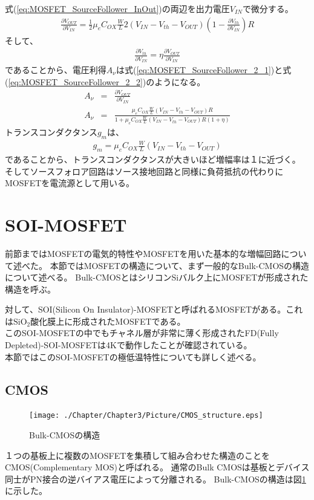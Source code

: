 			式(\ref{eq:MOSFET_SourceFollower_InOut})の両辺を出力電圧$V_{IN}$で微分する。
			\begin{eqnarray}
				\frac{\partial V_{OUT}}{\partial V_{IN}} = \frac{1}{2} \mu_e C_{OX} \frac{W}{L} 2 (V_{IN} - V_{th} - V_{OUT}) \left( 1 - \frac{\partial V_{th}}{\partial V_{IN}} \right) R
				\label{eq:MOSFET_SourceFollower_1}
			\end{eqnarray}
			そして、
			\begin{eqnarray}
				\frac{\partial V_{th}}{\partial V_{IN}} = \eta \frac{\partial V_{OUT}}{\partial V_{IN}}
			\end{eqnarray}
			であることから、電圧利得$A_{\nu}$は式(\ref{eq:MOSFET_SourceFollower_2_1})と式(\ref{eq:MOSFET_SourceFollower_2_2})のようになる。
			\begin{eqnarray}
				A_{\nu} & = & \frac{\partial V_{OUT}}{\partial V_{IN}} \\
				\label{eq:MOSFET_SourceFollower_2_1}
				A_{\nu} & = & \frac{\mu_e C_{OX} \frac{W}{L} (V_{IN} - V_{th} - V_{OUT}) R}{1 + \mu_e C_{OX} \frac{W}{L} (V_{IN} - V_{th} - V_{OUT}) R (1 + \eta)}
				\label{eq:MOSFET_SourceFollower_2_2}
			\end{eqnarray}
			トランスコンダクタンス$g_m$は、
			\begin{eqnarray}
				g_m = \mu_e C_{OX} \frac{W}{L} (V_{IN} - V_{th} - V_{OUT})
			\end{eqnarray}
			であることから、トランスコンダクタンスが大きいほど増幅率は１に近づく。
			そしてソースフォロア回路はソース接地回路と同様に負荷抵抗の代わりにMOSFETを電流源として用いる。
			\clearpage
\section{SOI-MOSFET}
	前節まではMOSFETの電気的特性やMOSFETを用いた基本的な増幅回路について述べた。
	本節ではMOSFETの構造について、まず一般的なBulk-CMOSの構造について述べる。
	Bulk-CMOSとはシリコンSiバルク上にMOSFETが形成された構造を呼ぶ。
	
	対して、SOI(Silicon On Insulator)-MOSFETと呼ばれるMOSFETがある。これは$\mathrm{SiO_2}$酸化膜上に形成されたMOSFETである。\\
	このSOI-MOSFETの中でもチャネル層が非常に薄く形成されたFD(Fully Depleted)-SOI-MOSFETは4Kで動作したことが確認されている。\\
	本節ではこのSOI-MOSFETの極低温特性についても詳しく述べる。
	\subsection{CMOS}
		\begin{figure}[htbp]
			\begin{center}
				\texttt{[image: ./Chapter/Chapter3/Picture/CMOS\_structure.eps]}
				\caption{Bulk-CMOSの構造}
				\label{fig:CMOS_structure}
			\end{center}
		\end{figure}
		１つの基板上に複数のMOSFETを集積して組み合わせた構造のことをCMOS(Complementary MOS)と呼ばれる。
		通常のBulk CMOSは基板とデバイス同士がPN接合の逆バイアス電圧によって分離される。
		Bulk-CMOSの構造は図\ref{fig:CMOS_structure}に示した。
		

